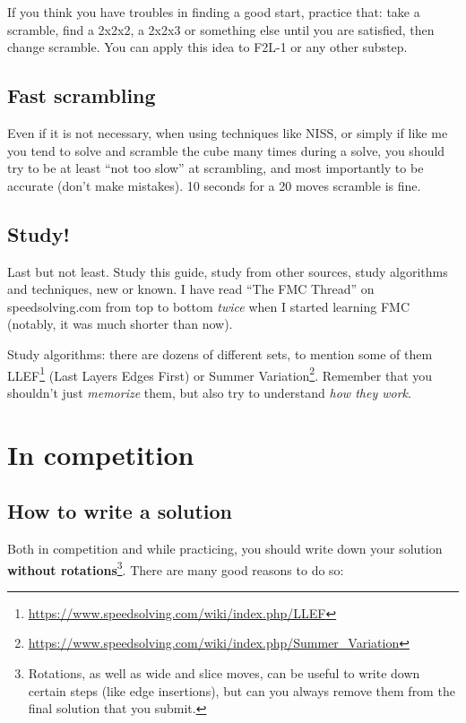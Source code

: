 \documentclass[11pt,a4paper]{book}
\begin{document}
If you think you have troubles in finding a good start, practice that: take a scramble, find a 2x2x2, a 2x2x3 or something else until you are satisfied, then change scramble. You can apply this idea to F2L-1 or any other substep.

\section{Fast scrambling}

Even if it is not necessary, when using techniques like NISS, or simply if like me you tend to solve and scramble the cube many times during a solve, you should try to be at least ``not too slow'' at scrambling, and most importantly to be accurate (don't make mistakes). 10 seconds for a 20 moves scramble is fine.

\section{Study!}

Last but not least. Study this guide, study from other sources, study algorithms and techniques, new or known. I have read ``The FMC Thread'' on speedsolving.com from top to bottom \emph{twice} when I started learning FMC (notably, it was much shorter than now).

Study algorithms: there are dozens of different sets, to mention some of them LLEF\footnote{\url{https://www.speedsolving.com/wiki/index.php/LLEF}} (Last Layers Edges First) or Summer Variation\footnote{\url{https://www.speedsolving.com/wiki/index.php/Summer_Variation}}. Remember that you shouldn't just \emph{memorize} them, but also try to understand \emph{how they work}.

\chapter{In competition}

\section{How to write a solution}
\label{write_down}

Both in competition and while practicing, you should write down your solution \textbf{without rotations}\footnote{Rotations, as well as wide and slice moves, can be useful to write down certain steps (like edge insertions), but can you always remove them from the final solution that you submit.}. There are many good reasons to do so:
\end{document}
